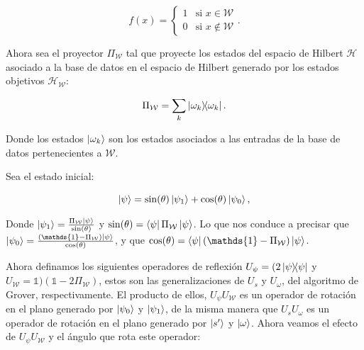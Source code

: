 \begin{equation}
    f(x) =
    \begin{cases}
        1 & \text{si } x \in \mathcal{W} \\
        0 & \text{si } x \not\in \mathcal{W}
    \end{cases} .
\end{equation}

Ahora sea el proyector $\Pi_\mathcal{W}$ tal que proyecte los estados del espacio de Hilbert $\mathcal{H}$ asociado a la base de datos en el espacio de Hilbert generado por los estados objetivos $\mathcal{H}_\mathcal{W}$:

\begin{equation}
    \Pi_\mathcal{W} = \sum\limits_k \ketbra{\omega_k}{\omega_k} .
\end{equation}

Donde los estados $\ket{\omega_k}$ son los estados asociados a las entradas de la base de datos pertenecientes a $\mathcal{W}$.

Sea el estado inicial:

\begin{equation}
    \ket{\psi} = \sin(\theta) \ket{\psi_1} + \cos(\theta) \ket{\psi_0} ,
\end{equation}

Donde $\ket{\psi_1} = \frac{\Pi_\mathcal{W} \ket{\psi}}{\sin(\theta)}$ y $\sin(\theta) = \bra{\psi} \Pi_\mathcal{W} \ket{\psi}$. Lo que nos conduce a precisar que $\ket{\psi_0} = \frac{(\mathds{1} - \Pi_\mathcal{W}) \ket{\psi}}{\cos(\theta)}$, y que $\cos(\theta) = \bra{\psi} (\mathds{1} - \Pi_\mathcal{W}) \ket{\psi}$.

Ahora definamos los siguientes operadores de reflexión $U_\psi = (2 \ketbra{\psi}{\psi}$ y $ U_\mathcal{W} = \mathds{1})(\mathds{1} - 2 \Pi_\mathcal{W})$, estos son las generalizaciones de $U_s$ y $U_\omega$, del algoritmo de Grover, respectivamente. El producto de ellos, $U_\psi U_\mathcal{W}$ es un operador de rotación en el plano generado por $\ket{\psi_0}$ y $\ket{\psi_1}$, de la misma manera que $U_s U_\omega$ es un operador de rotación en el plano generado por $\ket{s^\prime}$ y $\ket{\omega}$. Ahora veamos el efecto de $U_\psi U_\mathcal{W}$ y el ángulo que rota este operador:

